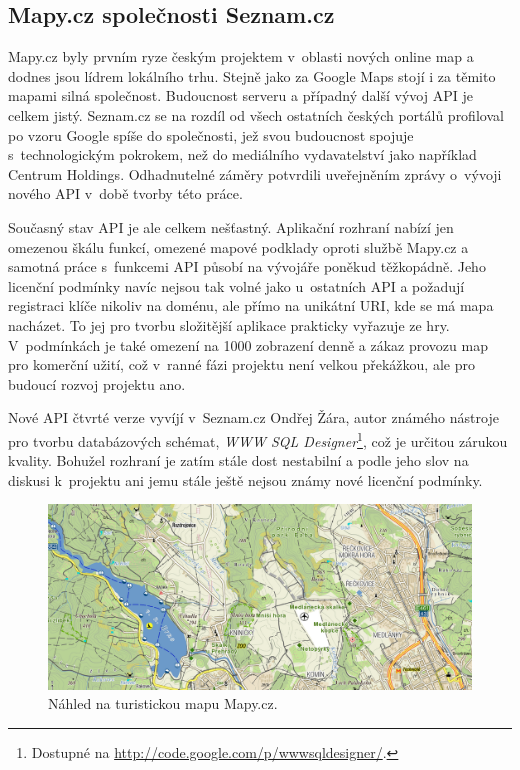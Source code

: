 \subsection{Mapy.cz společnosti Seznam.cz}
Mapy.cz byly prvním ryze českým projektem v~oblasti nových online map
a dodnes jsou lídrem lokálního trhu. Stejně jako za Google Maps stojí
i za těmito mapami silná společnost. Budoucnost serveru a případný
další vývoj API je celkem jistý. Seznam.cz se na rozdíl od všech
ostatních českých portálů profiloval po vzoru Google spíše do
společnosti, jež svou budoucnost spojuje s~technologickým pokrokem,
než do mediálního vydavatelství jako například Centrum Holdings.
Odhadnutelné záměry potvrdili uveřejněním zprávy o~vývoji nového
API \cite{apiSeznam} v~době tvorby této práce.

Současný stav API je ale celkem nešťastný. Aplikační rozhraní nabízí
jen omezenou škálu funkcí, omezené mapové podklady oproti službě
Mapy.cz a samotná práce s~funkcemi API působí na vývojáře poněkud
těžkopádně. Jeho licenční podmínky navíc nejsou tak volné jako
u~ostatních API a požadují registraci klíče nikoliv na doménu, ale
přímo na unikátní URI, kde se má mapa nacházet. To jej pro tvorbu
složitější aplikace prakticky vyřazuje ze hry. V~podmínkách je také
omezení na 1000 zobrazení denně a zákaz provozu map pro komerční
užití, což v~ranné fázi projektu není velkou překážkou, ale pro
budoucí rozvoj projektu ano.

Nové API čtvrté verze vyvíjí v~Seznam.cz Ondřej Žára, autor známého
nástroje pro tvorbu databázových schémat, {\it WWW SQL
Designer}\footnote{Dostupné na
\url{http://code.google.com/p/wwwsqldesigner/}.}, což je určitou zárukou kvality. Bohužel rozhraní je zatím stále dost
nestabilní a podle jeho slov na diskusi k~projektu ani jemu stále
ještě nejsou známy nové licenční podmínky.

\begin{figure}[h]
	\includegraphics[width=\textwidth, keepaspectratio]{fig/mapaseznam}
	\caption{Náhled na turistickou mapu Mapy.cz.}
	\label{obrSeznamMap}
\end{figure}

